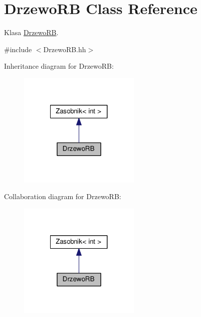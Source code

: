 \hypertarget{a00011}{}\section{Drzewo\+R\+B Class Reference}
\label{a00011}


Klasa \hyperlink{a00011}{Drzewo\+R\+B}.  




{\ttfamily \#include $<$Drzewo\+R\+B.\+hh$>$}



Inheritance diagram for Drzewo\+R\+B\+:
\nopagebreak
\begin{figure}[H]
\begin{center}
\leavevmode
\includegraphics[width=164pt]{a00145}
\end{center}
\end{figure}


Collaboration diagram for Drzewo\+R\+B\+:
\nopagebreak
\begin{figure}[H]
\begin{center}
\leavevmode
\includegraphics[width=164pt]{a00146}
\end{center}
\end{figure}
